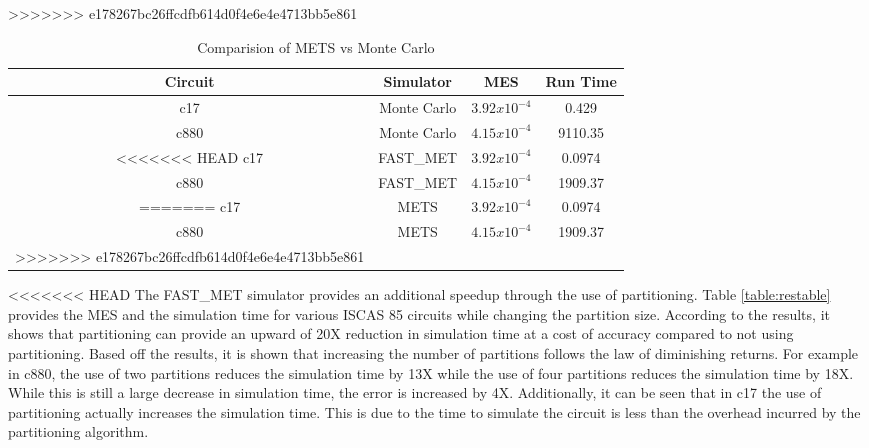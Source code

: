 \documentclass[conference]{IEEEtran}
\begin{document}
\begin{algorithm}
\begin{table}[ht]
\begin{center}
\begin{table}[ht]
	\begin{center}
		\caption{Comparision of METS vs Monte Carlo}
		\label{table:MCv}
>>>>>>> e178267bc26ffcdfb614d0f4e6e4e4713bb5e861
		\begin{tabular}{|c|c|c|c|}
			\hline
			Circuit& Simulator & MES & Run Time\\ 
			\hline
			c17 & Monte Carlo & $3.92x10^{-4}$ & 0.429\\
			\hline
			c880 & Monte Carlo & $4.15x10^{-4}$ & 9110.35\\
			\hline
<<<<<<< HEAD
			c17 & FAST\_MET & $3.92x10^{-4}$ & 0.0974\\
			\hline
			c880 & FAST\_MET & $4.15x10^{-4}$ & 1909.37\\
=======
			c17 & METS & $3.92x10^{-4}$ & 0.0974\\
			\hline
			c880 & METS & $4.15x10^{-4}$ & 1909.37\\
>>>>>>> e178267bc26ffcdfb614d0f4e6e4e4713bb5e861
			\hline
		\end{tabular}
	\end{center}
\end{table}

<<<<<<< HEAD
The FAST\_MET simulator provides an additional speedup through the use of partitioning. Table \ref{table:restable} provides the MES and the simulation time for various ISCAS 85 circuits while changing the partition size. According to the results, it shows that partitioning can provide an upward of 20X reduction in simulation time at a cost of accuracy compared to not using partitioning. Based off the results, it is shown that increasing the number of partitions follows the law of diminishing returns. For example in c880, the use of two partitions reduces the simulation time by 13X while the use of four partitions reduces the simulation time by 18X. While this is still a large decrease in simulation time, the error is increased by 4X. Additionally, it can be seen that in c17 the use of partitioning actually increases the simulation time. This is due to the time to simulate the circuit is less than the overhead incurred by the partitioning algorithm.


\end{center}
\end{table}
\end{algorithm}
\end{document}
